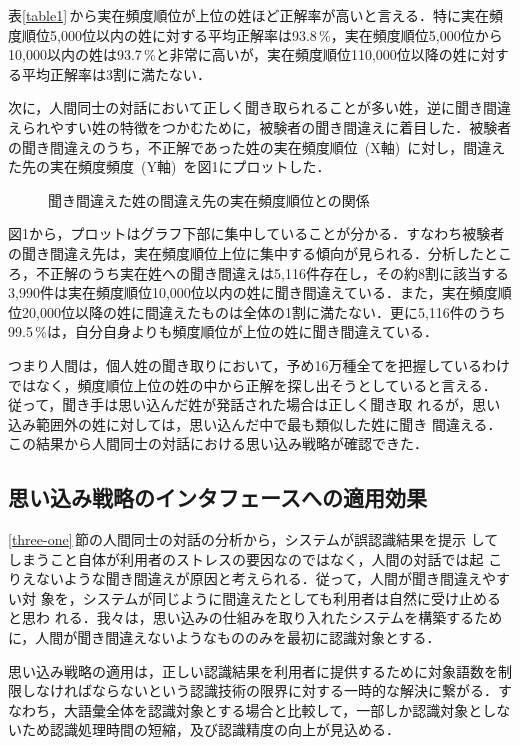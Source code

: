 表\ref{table1}\,から実在頻度順位が上位の姓ほど正解率が高いと言える．特に実在頻度順位5,000位以内の姓に対する平均正解率は93.8\,\%，実在頻度順位5,000位から10,000以内の姓は93.7\,\%と非常に高いが，実在頻度順位110,000位以降の姓に対する平均正解率は3割に満たない．

次に，人間同士の対話において正しく聞き取られることが多い姓，逆に聞き間違
えられやすい姓の特徴をつかむために，被験者の聞き間違えに着目した．被験者の聞き間違えのうち，不正解であった姓の実在頻度順位~(X軸)~に対し，間違えた先の実在頻度頻度~(Y軸)~を図1にプロットした．
\begin{figure}[htbp]
 \vspace*{-1cm}
  \begin{center}
    \leavevmode
   \epsfxsize=14cm
   \epsfysize=11cm
    \caption{聞き間違えた姓の間違え先の実在頻度順位との関係}
   \label{fig1}
  \end{center}
\end{figure}
図1から，プロットはグラフ下部に集中していることが分かる．すなわち被験者の聞き間違え先は，実在頻度順位上位に集中する傾向が見られる．分析したところ，不正解のうち実在姓への聞き間違えは5,116件存在し，その約8割に該当する3,990件は実在頻度順位10,000位以内の姓に聞き間違えている．また，実在頻度順位20,000位以降の姓に間違えたものは全体の1割に満たない．更に5,116件のうち99.5\,\%は，自分自身よりも頻度順位が上位の姓に聞き間違えている．

つまり人間は，個人姓の聞き取りにおいて，予め16万種全てを把握しているわけ
ではなく，頻度順位上位の姓の中から正解を探し出そうとしていると言える．
従って，聞き手は思い込んだ姓が発話された場合は正しく聞き取
れるが，思い込み範囲外の姓に対しては，思い込んだ中で最も類似した姓に聞き
間違える．この結果から人間同士の対話における思い込み戦略が確認できた．

\subsection{思い込み戦略のインタフェースへの適用効果}
\label{three-four}
\ref{three-one}\,節の人間同士の対話の分析から，システムが誤認識結果を提示
してしまうこと自体が利用者のストレスの要因なのではなく，人間の対話では起
こりえないような聞き間違えが原因と考えられる．従って，人間が聞き間違えやすい対
象を，システムが同じように間違えたとしても利用者は自然に受け止めると思わ
れる．我々は，思い込みの仕組みを取り入れたシステムを構築するために，人間が聞き間違えないようなもののみを最初に認識対象とする．

思い込み戦略の適用は，正しい認識結果を利用者に提供するために対象語数を制限しなければならないという認識技術の限界に対する一時的な解決に繋がる．すなわち，大語彙全体を認識対象とする場合と比較して，一部しか認識対象としないため認識処理時間の短縮，及び認識精度の向上が見込める．

